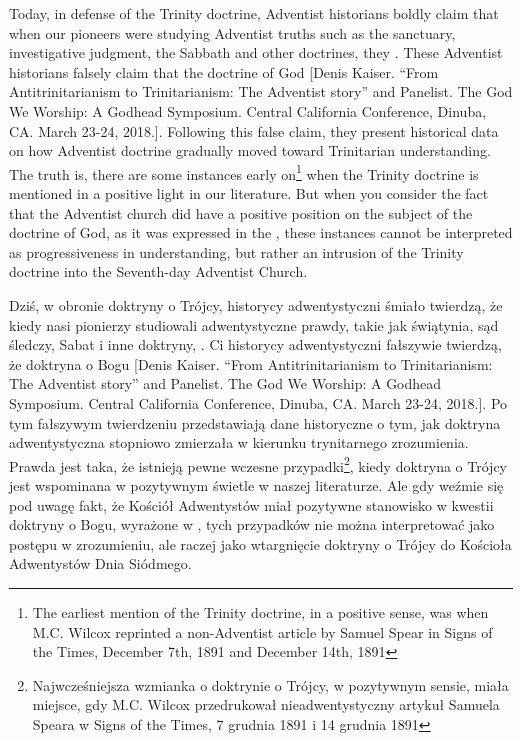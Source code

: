 Today, in defense of the Trinity doctrine, Adventist historians boldly claim that when our pioneers were studying Adventist truths such as the sanctuary, investigative judgment, the Sabbath and other doctrines, they . These Adventist historians falsely claim that the doctrine of God [Denis Kaiser. “From Antitrinitarianism to Trinitarianism: The Adventist story” and Panelist. The God We Worship: A Godhead Symposium. Central California Conference, Dinuba, CA. March 23-24, 2018.]. Following this false claim, they present historical data on how Adventist doctrine gradually moved toward Trinitarian understanding. The truth is, there are some instances early on\footnote{The earliest mention of the Trinity doctrine, in a positive sense, was when M.C. Wilcox reprinted a non-Adventist article by Samuel Spear in Signs of the Times, December 7th, 1891 and December 14th, 1891} when the Trinity doctrine is mentioned in a positive light in our literature. But when you consider the fact that the Adventist church did have a positive position on the subject of the doctrine of God, as it was expressed in the , these instances cannot be interpreted as progressiveness in understanding, but rather an intrusion of the Trinity doctrine into the Seventh-day Adventist Church.


Dziś, w obronie doktryny o Trójcy, historycy adwentystyczni śmiało twierdzą, że kiedy nasi pionierzy studiowali adwentystyczne prawdy, takie jak świątynia, sąd śledczy, Sabat i inne doktryny, . Ci historycy adwentystyczni fałszywie twierdzą, że doktryna o Bogu [Denis Kaiser. “From Antitrinitarianism to Trinitarianism: The Adventist story” and Panelist. The God We Worship: A Godhead Symposium. Central California Conference, Dinuba, CA. March 23-24, 2018.]. Po tym fałszywym twierdzeniu przedstawiają dane historyczne o tym, jak doktryna adwentystyczna stopniowo zmierzała w kierunku trynitarnego zrozumienia. Prawda jest taka, że istnieją pewne wczesne przypadki\footnote{Najwcześniejsza wzmianka o doktrynie o Trójcy, w pozytywnym sensie, miała miejsce, gdy M.C. Wilcox przedrukował nieadwentystyczny artykuł Samuela Speara w Signs of the Times, 7 grudnia 1891 i 14 grudnia 1891}, kiedy doktryna o Trójcy jest wspominana w pozytywnym świetle w naszej literaturze. Ale gdy weźmie się pod uwagę fakt, że Kościół Adwentystów miał pozytywne stanowisko w kwestii doktryny o Bogu, wyrażone w , tych przypadków nie można interpretować jako postępu w zrozumieniu, ale raczej jako wtargnięcie doktryny o Trójcy do Kościoła Adwentystów Dnia Siódmego.


